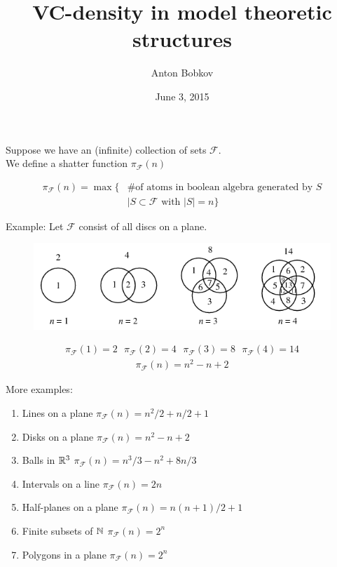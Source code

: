 \documentclass{beamer}
\title{VC-density in model theoretic structures}
\author{Anton Bobkov}
\date{June 3, 2015}
\newcommand{\F}{\mathcal F}
\begin{document}
\maketitle

\begin{frame}
	Suppose we have an (infinite) collection of sets $\F$. \\
	We define a shatter function $\pi_\F(n)$

	\begin{align*}
		\pi_\F(n) = \max \{ &\text {\# of atoms in boolean algebra generated by $S$} \\
		            &\mid S \subset \F \text{ with } |S| = n\}
	\end{align*}
\end{frame}

\begin{frame}
	Example: Let $\F$ consist of all discs on a plane.
	\begin{figure}[p]
    \centering
    \includegraphics[scale=0.75]{circle.png}
	\end{figure}
	\begin{align*}
		\pi_\F(1) = 2 \ \ \  \pi_\F(2) = 4 \ \ \  \pi_\F(3) = 8  \ \ \ \pi_\F(4) = 14
	\end{align*}
	\begin{align*}
		\pi_\F(n) = n^2 - n + 2
	\end{align*}
\end{frame}

\begin{frame}
More examples: \\
	\begin{enumerate}
		\item Lines on a plane $\pi_\F(n) = n^2/2 + n/2 + 1$
		\item Disks on a plane	$\pi_\F(n) = n^2 - n + 2$
		\item Balls in $\mathbb{R}^3$  $\pi_\F(n) = n^3/3 - n^2 + 8n/3$
		\item Intervals on a line $\pi_\F(n) = 2n$
		\item Half-planes on a plane $\pi_\F(n) = n(n+1)/2 + 1$
		\item Finite subsets of $\mathbb{N}$ $\pi_\F(n) = 2^n$
		\item Polygons in a plane $\pi_\F(n) = 2^n$
	\end{enumerate}
\end{frame}
\end{document}

